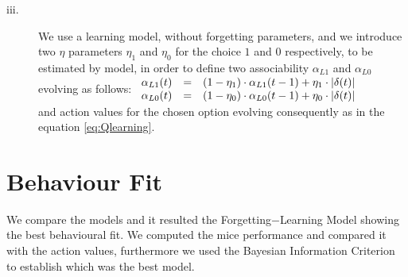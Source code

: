 \begin{description}
    \item[iii.] We use a learning model, without forgetting parameters, and we introduce two $\eta$ parameters $\eta_1$ and $\eta_0$ for the choice $1$ and $0$ respectively, to be estimated by model, in order to define two associability $\alpha_{L1}$ and $\alpha_{L0}$ evolving as follows:
    $\begin{array}{lcl}
    \alpha_{L1}(t) & = & (1-\eta_1)\cdot\alpha_{L1}(t-1)+\eta_1\cdot\left\lvert\delta(t)\right\rvert \\
    \alpha_{L0}(t) & = & (1-\eta_0)\cdot\alpha_{L0}(t-1)+\eta_0\cdot\left\lvert\delta(t)\right\rvert \\
    \end{array}$\\
    and action values for the chosen option evolving consequently as in the equation \ref{eq:Qlearning}.
\end{description}
\section{Behaviour Fit}
We compare the models and it resulted the Forgetting$-$Learning Model showing the best behavioural fit. We computed the mice performance and compared it with the action values, furthermore we used the Bayesian Information Criterion to establish which was the best model.\\

